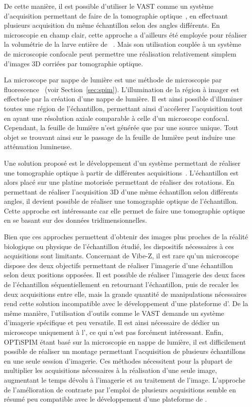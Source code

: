 \documentclass[\main/main.tex]{subfiles}
\begin{document}
%
De cette manière, il est possible d'utiliser le VAST comme un système d'acquisition permettant de faire de la tomographie optique~\cite{pardomartin_2013}, en effectuant plusieurs acquisition du même échantillon selon des angles différents.
%
En microscopie en champ clair,
cette approche a d'ailleurs été employée pour réaliser la volumétrie de la larve entière de \pz~\cite{guo_2017}.
%
Mais son utilisation couplée à un système de microscopie confocale peut permettre une réalisation relativement simplem d'images 3D corriées par tomographie optique.

%
La microscope par nappe de lumière est une méthode de microscopie par fluorescence~\cite{huisken_2004} (voir Section~\ref{sec:spim}).
%
L'illumination de la région à imager est effectuée par la création d'une nappe de lumière.
%
Il est ainsi possible d'illuminer toutes une région de l'échantillon, permettant ainsi d'accélerer l'acquisition tout en ayant une résolution axiale comparable à celle d'un microscope confocal.
%
Cependant, la feuille de lumière n'est générée que par une source unique.
%
Tout objet se trouvant ainsi sur le passage de la feuille de lumière peut induire une atténuation lumineuse.

%
Une solution proposé est le développement d'un système permettant de réaliser une tomographie optique à partir de différentes acquisitions~\cite{Mayer_2018}.
%
L'échantillon est alors placé sur une platine motorisée permettant de réaliser des rotations.
%
En permettant de réaliser l'acquisition 3D d'une même échantillon selon différents angles, il devient possible de réaliser une tomographie optique de l'échantillon.
%
Cette approche est intéressante car elle permet de faire une tomographie optique en se basant sur des données tridimensionnelles.

%
Bien que ces approches permettent d'obtenir des images plus proches de la réalité biologique ou physique de l'échantillon étudié, les dispositifs nécessaires à ces acquisitions sont limitants.
%
Concernant de Vibe-Z, il est rare qu'un microscope dispose des deux objectifs permettant de réaliser l'imagerie d'une échantillon selon deux positions opposées.
%
Il est possible de réaliser l'imagerie des deux faces de l'échantillon séquentiellement en retournant l'échantillon, puis de recaler les deux acquisitions entre elle, mais la grande quantité de manipulations nécessaires rend cette solution incompatible avec le développement d'une plateforme d'\hti{}.
%
De la même manière, l'utilisation d'outils comme le VAST demande un système d'imagerie spécifique et peu versatile. Il est ainsi nécessaire de dédier un microscope uniquement à l'\hti{}, ce qui n'est pas forcément intéressant.
%
Enfin, OPTiSPIM étant basé sur la microscopie en nappe de lumière, il est difficilement possible de réaliser un montage permettant l'acquisition de plusieurs échantillons en une seule session d'imagerie.
%
Ces méthodes nécessitent pour la plupart de multiplier les acquisitions nécessaires à la réalisation d'une seule image, augmentant le temps dévolu à l'imagerie et au traitement de l'image.
%
L'approche de l'amélioration de contraste par l'emploi de plusieurs acquisitions semble en résumé peu compatible avec le développement d'une plateforme de \hcs{}.
\end{document}
